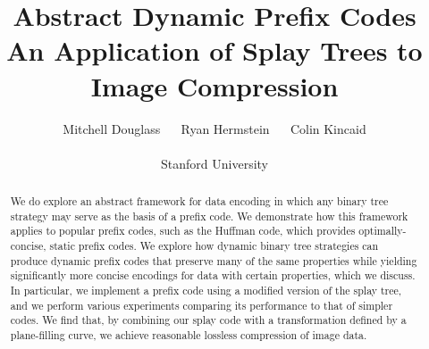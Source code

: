 \documentclass[twoside]{article}
\title{\vspace{-15mm}Abstract Dynamic Prefix Codes \\ \vspace{0.5em} \Large An Application of Splay Trees to Image Compression} %
\author{
\normalsize Mitchell Douglass \,\,\,\,\,\, Ryan Hermstein \,\,\,\,\,\, Colin Kincaid \\\\
Stanford University
\vspace{-5mm}
}
\date{}
\begin{document}
\maketitle %

\thispagestyle{fancy} %

\begin{abstract}

\noindent We do explore an abstract framework for data encoding in which any binary tree strategy may serve as the basis of a prefix code. We demonstrate how this framework applies to popular prefix codes, such as the Huffman code, which provides optimally-concise, static prefix codes. We explore how dynamic binary tree strategies can produce dynamic prefix codes that preserve many of the same properties while yielding significantly more concise encodings for data with certain properties, which we discuss. In particular, we implement a prefix code using a modified version of the splay tree, and we perform various experiments comparing its performance to that of simpler codes. We find that, by combining our splay code with a transformation defined by a plane-filling curve, we achieve reasonable lossless compression of image data.

\end{abstract}
\end{document}
